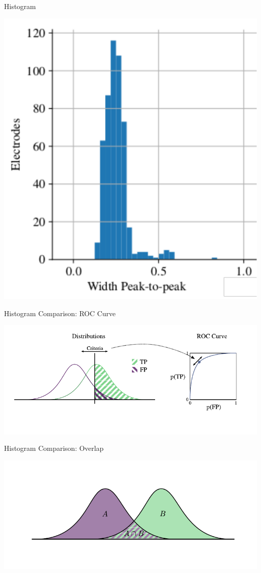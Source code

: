 \documentclass[aspectratio=169]{beamer}
\begin{document}
\begin{frame}{Histogram}
    \begin{center}
        \includegraphics[width=.5\textwidth]{images/sphere_spike_width_II_hist_mod.pdf}
    \end{center}
\end{frame}

\begin{frame}{Histogram Comparison: ROC Curve}
    \begin{center}
        \includegraphics[width=\textwidth]{images/roc_curve.pdf}
    \end{center}
\end{frame}

\begin{frame}{Histogram Comparison: Overlap}
    \begin{center}
        \includegraphics[width=\textwidth]{images/hist_inter.pdf}
    \end{center}
\end{frame}
\end{document}
